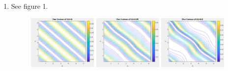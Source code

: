 \documentclass{article}
\begin{document}
\begin{enumerate}[label=\alph*)]
\begin{proof}
\begin{align*}
            &= \frac{1}{4\pi^2}\int_0^{2\pi}\int_0^{2\pi}1 - \cos(2x+2y)dxdy\\
            &= \frac{1}{4\pi^2}\left(4\pi^2 -
            \int_0^{2\pi}\int_0^{2\pi}\cos(2x+2y)dxdy\right)\\
            &= 1 - \frac{1}{4\pi^2}\int_0^{2\pi}\int_0^{2\pi}\cos(2x+2y)dxdy\\
            &= 1 - \frac{1}{4\pi^2}\int_0^{2\pi}0dxdy\\
            &= 1
        \end{align*}
        Thus we have that U will satisfy this integral at every timestep.
    \end{proof}
    
    \item See figure 1.
    \begin{figure}
        \centering
            \includegraphics[width=0.32\textwidth]{t0charcontour.png}
            \includegraphics[width=0.32\textwidth]{t25charcontour.png}
            \includegraphics[width=0.32\textwidth]{t5charcontour.png}
        \emp


\end{figure}
\end{enumerate}
\end{document}
